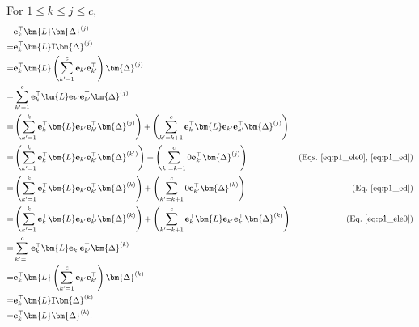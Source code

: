 \documentclass{article} %
\begin{document}
For $1 \le k \le j \le c$,
\begin{equation}
\begin{aligned}
& \mathbf{e}_{k}^\top \bm{L} \bm{\Delta}^{(j)} \\
= & \mathbf{e}_{k}^\top \bm{L} \mathbf{I} \bm{\Delta}^{(j)} \\
= & \mathbf{e}_{k}^\top \bm{L} \left( \sum_{k'=1}^{c} \mathbf{e}_{k'} \mathbf{e}_{k'}^\top \right) \bm{\Delta}^{(j)} \\
= & \sum_{k'=1}^{c} \mathbf{e}_{k}^\top \bm{L} \mathbf{e}_{k'} \mathbf{e}_{k'}^\top \bm{\Delta}^{(j)} \\
= & \left( \sum_{k'=1}^{k} \mathbf{e}_{k}^\top \bm{L} \mathbf{e}_{k'} \mathbf{e}_{k'}^\top \bm{\Delta}^{(j)} \right) + \left( \sum_{k'=k+1}^{c} \mathbf{e}_{k}^\top \bm{L} \mathbf{e}_{k'} \mathbf{e}_{k'}^\top \bm{\Delta}^{(j)} \right) \\
= & \left( \sum_{k'=1}^{k} \mathbf{e}_{k}^\top \bm{L} \mathbf{e}_{k'} \mathbf{e}_{k'}^\top \bm{\Delta}^{(k')} \right) + \left( \sum_{k'=k+1}^{c} 0 \mathbf{e}_{k'}^\top \bm{\Delta}^{(j)} \right) & \text{(Eqs.~\ref{eq:p1_ele0},~\ref{eq:p1_ed})} \\
= & \left( \sum_{k'=1}^{k} \mathbf{e}_{k}^\top \bm{L} \mathbf{e}_{k'} \mathbf{e}_{k'}^\top \bm{\Delta}^{(k)} \right) + \left( \sum_{k'=k+1}^{c} 0 \mathbf{e}_{k'}^\top \bm{\Delta}^{(k)} \right) & \text{(Eq.~\ref{eq:p1_ed})} \\
= & \left( \sum_{k'=1}^{k} \mathbf{e}_{k}^\top \bm{L} \mathbf{e}_{k'} \mathbf{e}_{k'}^\top \bm{\Delta}^{(k)} \right) + \left( \sum_{k'=k+1}^{c} \mathbf{e}_{k}^\top \bm{L} \mathbf{e}_{k'} \mathbf{e}_{k'}^\top \bm{\Delta}^{(k)} \right) & \text{(Eq.~\ref{eq:p1_ele0})} \\
= & \sum_{k'=1}^{c} \mathbf{e}_{k}^\top \bm{L} \mathbf{e}_{k'} \mathbf{e}_{k'}^\top \bm{\Delta}^{(k)} \\
= & \mathbf{e}_{k}^\top \bm{L} \left( \sum_{k'=1}^{c} \mathbf{e}_{k'} \mathbf{e}_{k'}^\top \right) \bm{\Delta}^{(k)} \\
= & \mathbf{e}_{k}^\top \bm{L} \mathbf{I} \bm{\Delta}^{(k)} \\
= & \mathbf{e}_{k}^\top \bm{L} \bm{\Delta}^{(k)} .
\end{aligned}
\label{eq:p1_eld}
\end{equation}
\end{document}
